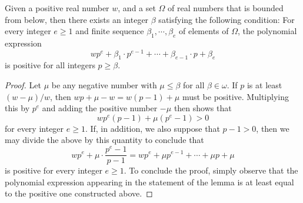 \documentclass[11pt]{amsart}
\renewcommand{\!}[1]{{\color{red}\text{$\star$\,}#1\,$\star$}}
\begin{document}
\newpage


\begin{lemma}
\label{positive polynomial: L}
Given a positive real number $w$, and a set $\Omega$ of real numbers that is bounded from below, then there exists an integer $\beta$ satisfying the following condition\textup:  For every integer $e \geq 1$ and finite sequence $\beta_1, \cdots, \beta_e$ of elements of $\Omega$, the polynomial expression \[ wp^{e} + \beta_1 \cdot p^{e-1} + \cdots + \beta_{e-1} \cdot p + \beta_e  \] is positive for all integers $p \geq \beta$.
\end{lemma}

\begin{proof}
Let $\mu$ be any negative number with $\mu \leq \beta$ for all $\beta \in \omega$.    If $p$ is at least $(w-\mu)/w$, then $wp + \mu - w = w(p-1) + \mu$ must be positive.  Multiplying this by $p^e$ and adding the positive number $-\mu$ then shows that
%
\[ wp^e ( p-1 ) + \mu (p^e-1) > 0 \] for every integer $e \geq 1$.   If, in addition, we also suppose that $p -1 > 0$, then we may divide the above by this quantity to conclude that \[ w p^e + \mu \cdot \frac{ p^e - 1}{p-1} = wp^e + \mu p^{e-1} + \cdots + \mu p + \mu \] is positive for every integer $e \geq 1$.   To conclude the proof, simply observe that the polynomial expression appearing in the statement of the lemma is at least equal to the positive one constructed above.
\end{proof}
\end{document}
